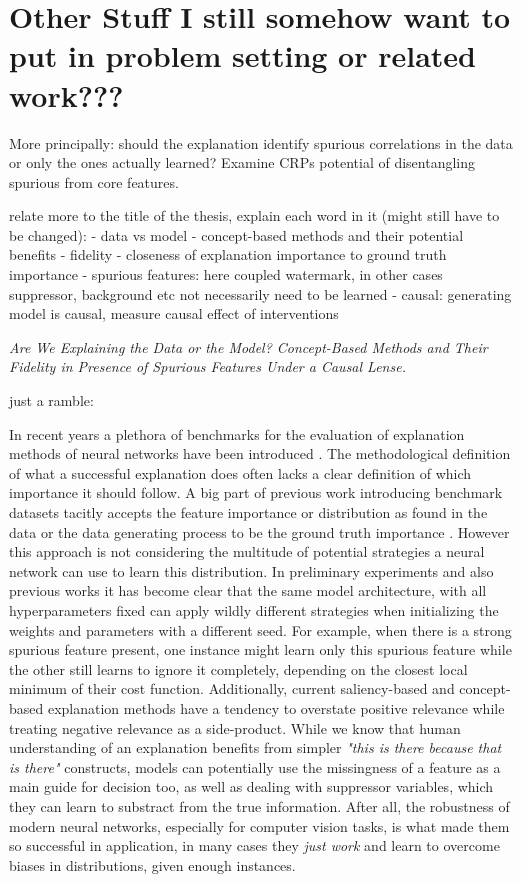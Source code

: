 { \color{gray}


\section{Other Stuff I still somehow want to put in problem setting or related work???}

More principally: should the explanation identify spurious correlations in the data or only the ones actually learned?
Examine CRPs potential of disentangling spurious from core features.


relate more to the title of the thesis, explain each word in it (might still have to be changed):
- data vs model
- concept-based methods and their potential benefits
- fidelity - closeness of explanation importance to ground truth importance
- spurious features: here coupled watermark, in other cases suppressor, background etc not necessarily need to be learned
- causal: generating model is causal, measure causal effect of interventions

\textit{Are We Explaining the Data or the Model?
    Concept-Based Methods and Their Fidelity in Presence of Spurious Features Under a Causal Lense.}

just a ramble:

In recent years a plethora of benchmarks for the evaluation of explanation methods of neural networks have been introduced .
The methodological definition of what a successful explanation does often lacks a clear definition of which importance it should follow. A big part of previous work introducing benchmark datasets tacitly accepts the feature importance or distribution as found in the data or the data generating process to be the ground truth importance . However this approach is not considering the multitude of potential strategies a neural network can use to learn this distribution.
In preliminary experiments and also previous works it has become clear that the same model architecture, with all hyperparameters fixed can apply wildly different strategies when initializing the weights and parameters with a different seed. For example, when there is a strong spurious feature present, one instance might learn only this spurious feature while the other still learns to ignore it completely, depending on the closest local minimum of their cost function.
Additionally, current saliency-based and concept-based explanation methods have a tendency to overstate positive relevance while treating negative relevance as a side-product. While we know that human understanding of an explanation benefits from simpler \textit{"this is there because that is there"} constructs, models can potentially use the missingness of a feature as a main guide for decision too, as well as dealing with suppressor variables, which they can learn to substract from the true information. After all, the robustness of modern neural networks, especially for computer vision tasks, is what made them so successful in application, in many cases they \textit{just work} and learn to overcome biases in distributions, given enough instances. 


}
